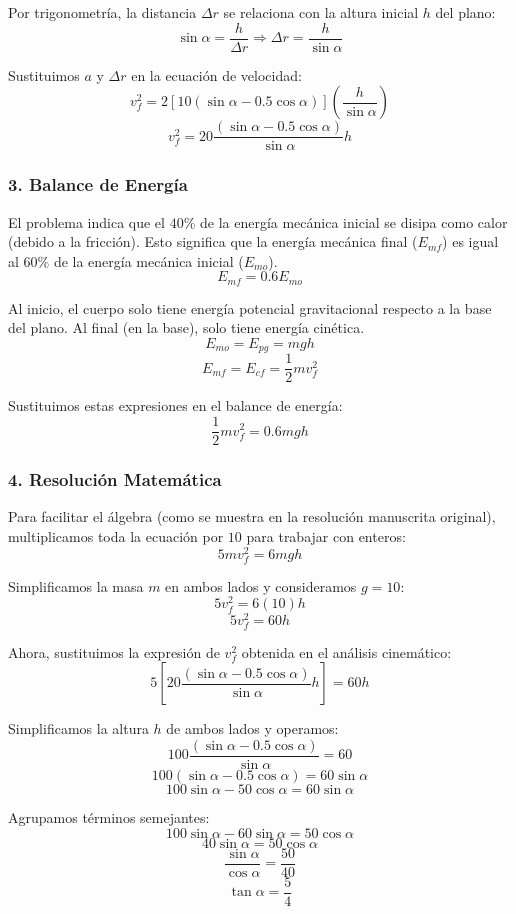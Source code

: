 \documentclass[12pt, a4paper]{article}
\begin{document}
Por trigonometría, la distancia $\Delta r$ se relaciona con la altura inicial $h$ del plano:
$$ \sin\alpha = \frac{h}{\Delta r} \Rightarrow \Delta r = \frac{h}{\sin\alpha} $$

Sustituimos $a$ y $\Delta r$ en la ecuación de velocidad:
$$ v_f^2 = 2 \left[ 10 (\sin\alpha - 0.5 \cos\alpha) \right] \left( \frac{h}{\sin\alpha} \right) $$
$$ v_f^2 = 20 \frac{(\sin\alpha - 0.5 \cos\alpha)}{\sin\alpha} h $$

\subsubsection*{3. Balance de Energía}
El problema indica que el $40\%$ de la energía mecánica inicial se disipa como calor (debido a la fricción). Esto significa que la energía mecánica final ($E_{mf}$) es igual al $60\%$ de la energía mecánica inicial ($E_{mo}$).
$$ E_{mf} = 0.6 E_{mo} $$

Al inicio, el cuerpo solo tiene energía potencial gravitacional respecto a la base del plano. Al final (en la base), solo tiene energía cinética.
$$ E_{mo} = E_{pg} = mgh $$
$$ E_{mf} = E_{cf} = \frac{1}{2} mv_f^2 $$

Sustituimos estas expresiones en el balance de energía:
$$ \frac{1}{2} mv_f^2 = 0.6 mgh $$

\subsubsection*{4. Resolución Matemática}
Para facilitar el álgebra (como se muestra en la resolución manuscrita original), multiplicamos toda la ecuación por $10$ para trabajar con enteros:
$$ 5 mv_f^2 = 6 mgh $$

Simplificamos la masa $m$ en ambos lados y consideramos $g = 10$:
$$ 5 v_f^2 = 6(10)h $$
$$ 5 v_f^2 = 60h $$

Ahora, sustituimos la expresión de $v_f^2$ obtenida en el análisis cinemático:
$$ 5 \left[ 20 \frac{(\sin\alpha - 0.5 \cos\alpha)}{\sin\alpha} h \right] = 60h $$

Simplificamos la altura $h$ de ambos lados y operamos:
$$ 100 \frac{(\sin\alpha - 0.5 \cos\alpha)}{\sin\alpha} = 60 $$
$$ 100 (\sin\alpha - 0.5 \cos\alpha) = 60 \sin\alpha $$
$$ 100 \sin\alpha - 50 \cos\alpha = 60 \sin\alpha $$

Agrupamos términos semejantes:
$$ 100 \sin\alpha - 60 \sin\alpha = 50 \cos\alpha $$
$$ 40 \sin\alpha = 50 \cos\alpha $$
$$ \frac{\sin\alpha}{\cos\alpha} = \frac{50}{40} $$
$$ \tan\alpha = \frac{5}{4} $$
\end{document}
